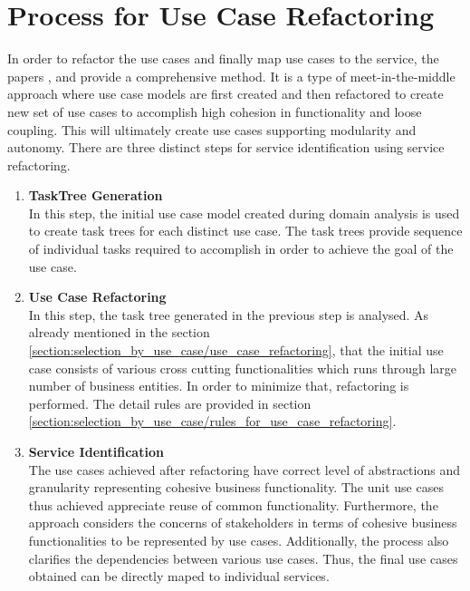 \section{Process for Use Case Refactoring}\label{section:selection_by_use_case/process_for_use_case_refactoring}
In order to refactor the use cases and finally map use cases to the service, the papers \cite{Kim:2006aa}, \cite{Yun:2006aa} and \cite{Doh:2007aa} provide a comprehensive method. It is a type of meet-in-the-middle approach where use case models are first created and then refactored to create new set of use cases to accomplish high cohesion in functionality and loose coupling. This will ultimately create use cases supporting modularity and autonomy. \cite{Fareghzadeh:2008aa} There are three distinct steps for service identification using service refactoring.
\begin{enumerate}
\item \textbf{TaskTree Generation}\\
In this step, the initial use case model created during domain analysis is used to create task trees for each distinct use case. The task trees provide sequence of individual tasks required to accomplish in order to achieve the goal of the use case.
\\
\item \textbf{Use Case Refactoring}\\
In this step, the task tree generated in the previous step is analysed. As already mentioned in the section \ref{section:selection_by_use_case/use_case_refactoring}, that the initial use case consists of various cross cutting functionalities which runs through large number of business entities. In order to minimize that, refactoring is performed. The detail rules are provided in section \ref{section:selection_by_use_case/rules_for_use_case_refactoring}.
\\
\item \textbf{Service Identification}\\
The use cases achieved after refactoring have correct level of abstractions and granularity representing cohesive business functionality. The unit use cases thus achieved appreciate reuse of common functionality.  \cite{Doh:2007aa} Furthermore, the approach considers the concerns of stakeholders in terms of cohesive business functionalities to be represented by use cases.\cite{Fareghzadeh:2008aa} Additionally, the process also clarifies the dependencies between various use cases. Thus, the final use cases obtained can be directly maped to individual services.
\end{enumerate}
\\
